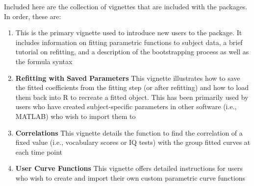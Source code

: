 Included here are the collection of vignettes that are included with the  packages. In order, these are:

\begin{enumerate}
\item \textbf{} This is the primary vignette used to introduce new users to the package. It includes information on fitting parametric functions to subject data, a brief tutorial on refitting, and a description of the bootstrapping process as well as the  formula syntax
\item \textbf{Refitting with Saved Parameters} This vignette illustrates how to save the fitted coefficients from the fitting step (or after refitting) and how to load them back into R to recreate a fitted  object. This has been primarily used by users who have created subject-specific parameters in other software (i.e., MATLAB) who wish to import them to 
\item \textbf{Correlations} This vignette details the  function to find the correlation of a fixed value (i.e., vocabulary scores or IQ tests) with the group fitted curves at each time point
\item \textbf{User Curve Functions} This vignette offers detailed instructions for users who wish to create and import their own custom parametric curve functions
\end{enumerate}










